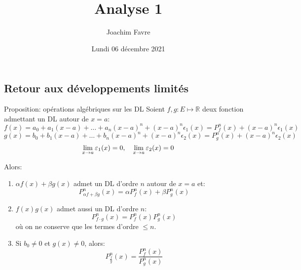 \documentclass[a4paper]{article}
\title{Analyse 1}
\author{Joachim Favre}
\date{Lundi 06 décembre 2021}
\begin{document}
\maketitle


\subsection{Retour aux développements limités}
\begin{parag}{Proposition: opérations algébriques sur les DL}
    Soient $f,g : E \mapsto \mathbb{R}$ deux fonction admettant un DL autour de $x = a$:
    \[f\left(x\right) = a_0 + a_1\left(x - a\right) + \ldots + a_n\left(x - a\right)^n + \left(x - a\right)^n \epsilon_1\left(x\right) = P_f^n\left(x\right) + \left(x - a\right)^n \epsilon_1\left(x\right)\]
    \[g\left(x\right) = b_0 + b_1\left(x - a\right) + \ldots + b_n\left(x - a\right)^n + \left(x - a\right)^n \epsilon_2\left(x\right) = P_g^n\left(x\right) + \left(x - a\right)^n \epsilon_2\left(x\right)\]
    \[\lim_{x \to a} \epsilon_1\left(x\right) = 0, \mathspace \lim_{x \to a} \epsilon_2\left(x\right) = 0\]

    Alors:
    \begin{enumerate}
        \item $\alpha f\left(x\right) + \beta g\left(x\right)$ admet un DL d'ordre $n$ autour de $x = a$ et:
            \[P^n_{\alpha f + \beta g}\left(x\right) = \alpha P_{f}^n\left(x\right) + \beta P_g^n\left(x\right)\]
        \item $f\left(x\right)g\left(x\right)$ admet aussi un DL d'ordre $n$:
            \[P_{f \cdot g}^n\left(x\right) = P_f^n\left(x\right) P_g^n\left(x\right)\]
            où on ne conserve que les termes d'ordre $\leq n$.

        \item Si $b_0 \neq 0$ et $g\left(x\right) \neq 0$, alors:
            \[P^n_{\frac{f}{g}}\left(x\right) = \frac{P_f^n\left(x\right)}{P_{g}^n\left(x\right)}\]

    \end{enumerate}
\end{parag}
\end{document}

